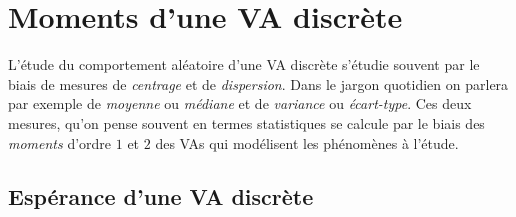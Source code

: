 \documentclass[11pt, a4paper]{article}
\begin{document}
\section{Moments d'une VA discrète}
\label{sec:momentsVAdiscrète}

L'étude du comportement aléatoire d'une VA discrète s'étudie souvent
par le biais de mesures de \emph{centrage} et de
\emph{dispersion}. Dans le jargon quotidien on parlera par exemple de
\textit{moyenne} ou \textit{médiane} et de \textit{variance} ou
\textit{écart-type}. Ces deux mesures, qu'on pense souvent en termes
statistiques se calcule par le biais des \emph{moments} d'ordre $1$ et
$2$ des VAs qui modélisent les phénomènes à l'étude.

\subsection{Espérance d'une VA discrète}
\label{sec:esperance}
\end{document}
